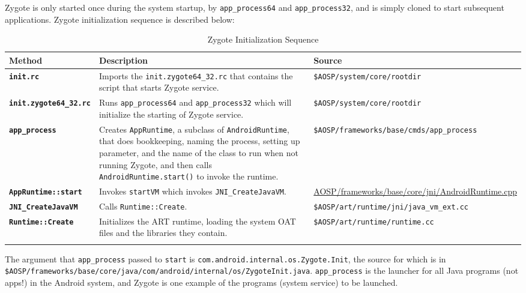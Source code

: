 Zygote is only started once during the system startup, by \texttt{app\_process64} and \texttt{app\_process32}, and is simply cloned to start subsequent applications. Zygote initialization sequence is described below:
\begin{longtable}{p{.25\linewidth}  p{.50\linewidth} p{.25\linewidth}} 
\toprule
Method 	& Description & Source\\
\midrule

\texttt{\textbf{init.rc}} 
&Imports the \texttt{init.zygote64\_32.rc} that contains the script that starts Zygote service.
&\texttt{\$AOSP/system/core/rootdir}\\

\texttt{\textbf{init.zygote64\_32.rc}} 
&Runs \texttt{app\_process64} and \texttt{app\_process32} which will initialize the starting of Zygote service.
&\texttt{\$AOSP/system/core/rootdir}\\

\texttt{\textbf{app\_process}} 
&Creates \texttt{AppRuntime}, a subclass of \texttt{AndroidRuntime}, that does bookkeeping, naming the process, setting up parameter, and the name of the class to run when not running Zygote, and then calls \texttt{AndroidRuntime.start()} to invoke the runtime.
&\texttt{\$AOSP/frameworks/base/cmds/app\_process}\\

\texttt{\textbf{AppRuntime::start}} 
&Invokes \texttt{startVM} which invokes \texttt{JNI\_CreateJavaVM}.
&\url{AOSP/frameworks/base/core/jni/AndroidRuntime.cpp}\\

\texttt{\textbf{JNI\_CreateJavaVM}} 
&Calls \texttt{Runtime::Create}.
&\texttt{\$AOSP/art/runtime/jni/java\_vm\_ext.cc}\\

\texttt{\textbf{Runtime::Create}} 
&Initializes the ART runtime, loading the system OAT files and the libraries they contain.
&\texttt{\$AOSP/art/runtime/runtime.cc}\\

\midrule
\caption{Zygote Initialization Sequence} 
\label{tab:zygoteinitializationsequence}
\end{longtable}

The argument that \texttt{app\_process} passed to \texttt{start} is \texttt{com.android.internal.os.Zygote.Init}, the source for which is in \texttt{\$AOSP/frameworks/base/core/java/com/android/internal/os/ZygoteInit.java}. \texttt{app\_process} is the launcher for all Java programs (not apps!) in the Android system, and Zygote is one example of the programs (system service) to be launched.

